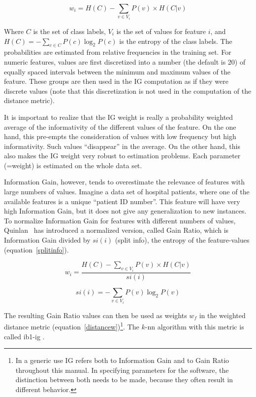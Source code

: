 \documentclass{report}
\begin{document}
\begin{equation}
w_{i} = H(C) -  \sum_{v \in V_{i}} P(v) \times H(C|v)
\label{IGgain}
\end{equation}

Where $C$ is the set of class labels, $V_{i}$ is the set of values for
feature $i$, and $H(C) = - \sum_{c \in C} P(c) \log_{2} P(c)$ is the
entropy of the class labels. The probabilities are estimated from
relative frequencies in the training set. For numeric features, values
are first discretized into a number (the default is 20) of equally
spaced intervals between the minimum and maximum values of the
feature. These groups are then used in the IG computation as if they
were discrete values (note that this discretization is not used in the
computation of the distance metric).

It is important to realize that the IG weight is really a probability
weighted average of the informativity of the different values of the
feature. On the one hand, this pre-empts the consideration of values
with low frequency but high informativity. Such values ``disappear''
in the average. On the other hand, this also makes the IG weight very
robust to estimation problems. Each parameter (=weight) is estimated
on the whole data set.

Information Gain, however, tends to overestimate the relevance of
features with large numbers of values. Imagine a data set of hospital
patients, where one of the available features is a unique ``patient ID
number''. This feature will have very high Information Gain, but it
does not give any generalization to new instances. To normalize
Information Gain for features with different numbers of values,
Quinlan~\cite{Quinlan93} has introduced a normalized version, called
Gain Ratio, which is Information Gain divided by $si(i)$ (split info),
the entropy of the feature-values (equation~\ref{splitinfo}).

\begin{equation}
w_{i} = \frac{H(C) -  \sum_{v \in V_{i}} P(v) \times H(C|v)}{si(i)}
\label{IGgainratio}
\end{equation}

\begin{equation}
si(i) = - \sum_{v \in V_{i}} P(v) \log_{2} P(v)
\label{splitinfo}
\end{equation}

The resulting Gain Ratio values can then be used as weights $w_{f}$ in
the weighted distance metric (equation~\ref{distancew})\footnote{In a
generic use IG refers both to Information Gain and to Gain Ratio
throughout this manual. In specifying parameters for the software, the
distinction between both needs to be made, because they often result
in different behavior.}. The $k$-{\sc nn} algorithm with this
metric is called {\sc ib1-ig} \cite{Daelemans+92b}.
\end{document}
